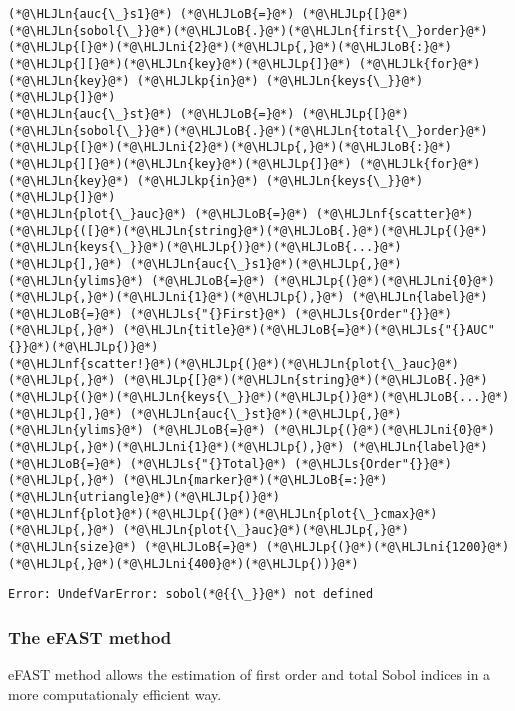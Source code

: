 \documentclass[12pt,a4paper]{article}
\newcommand{\HLJLk}[1]{\textcolor[RGB]{148,91,176}{\textbf{#1}}}
\newcommand{\HLJLkp}[1]{\textcolor[RGB]{148,91,176}{\textbf{#1}}}
\newcommand{\HLJLn}[1]{#1}
\newcommand{\HLJLnf}[1]{\textcolor[RGB]{66,102,213}{#1}}
\newcommand{\HLJLs}[1]{\textcolor[RGB]{201,61,57}{#1}}
\newcommand{\HLJLni}[1]{\textcolor[RGB]{59,151,46}{#1}}
\newcommand{\HLJLoB}[1]{\textcolor[RGB]{102,102,102}{\textbf{#1}}}
\newcommand{\HLJLp}[1]{#1}
\begin{document}
\begin{lstlisting}
(*@\HLJLn{auc{\_}s1}@*) (*@\HLJLoB{=}@*) (*@\HLJLp{[}@*)(*@\HLJLn{sobol{\_}}@*)(*@\HLJLoB{.}@*)(*@\HLJLn{first{\_}order}@*)(*@\HLJLp{[}@*)(*@\HLJLni{2}@*)(*@\HLJLp{,}@*)(*@\HLJLoB{:}@*)(*@\HLJLp{][}@*)(*@\HLJLn{key}@*)(*@\HLJLp{]}@*) (*@\HLJLk{for}@*) (*@\HLJLn{key}@*) (*@\HLJLkp{in}@*) (*@\HLJLn{keys{\_}}@*)(*@\HLJLp{]}@*)
(*@\HLJLn{auc{\_}st}@*) (*@\HLJLoB{=}@*) (*@\HLJLp{[}@*)(*@\HLJLn{sobol{\_}}@*)(*@\HLJLoB{.}@*)(*@\HLJLn{total{\_}order}@*)(*@\HLJLp{[}@*)(*@\HLJLni{2}@*)(*@\HLJLp{,}@*)(*@\HLJLoB{:}@*)(*@\HLJLp{][}@*)(*@\HLJLn{key}@*)(*@\HLJLp{]}@*) (*@\HLJLk{for}@*) (*@\HLJLn{key}@*) (*@\HLJLkp{in}@*) (*@\HLJLn{keys{\_}}@*)(*@\HLJLp{]}@*)
(*@\HLJLn{plot{\_}auc}@*) (*@\HLJLoB{=}@*) (*@\HLJLnf{scatter}@*)(*@\HLJLp{([}@*)(*@\HLJLn{string}@*)(*@\HLJLoB{.}@*)(*@\HLJLp{(}@*)(*@\HLJLn{keys{\_}}@*)(*@\HLJLp{)}@*)(*@\HLJLoB{...}@*)(*@\HLJLp{],}@*) (*@\HLJLn{auc{\_}s1}@*)(*@\HLJLp{,}@*) (*@\HLJLn{ylims}@*) (*@\HLJLoB{=}@*) (*@\HLJLp{(}@*)(*@\HLJLni{0}@*)(*@\HLJLp{,}@*)(*@\HLJLni{1}@*)(*@\HLJLp{),}@*) (*@\HLJLn{label}@*) (*@\HLJLoB{=}@*) (*@\HLJLs{"{}First}@*) (*@\HLJLs{Order"{}}@*)(*@\HLJLp{,}@*) (*@\HLJLn{title}@*)(*@\HLJLoB{=}@*)(*@\HLJLs{"{}AUC"{}}@*)(*@\HLJLp{)}@*)
(*@\HLJLnf{scatter!}@*)(*@\HLJLp{(}@*)(*@\HLJLn{plot{\_}auc}@*)(*@\HLJLp{,}@*) (*@\HLJLp{[}@*)(*@\HLJLn{string}@*)(*@\HLJLoB{.}@*)(*@\HLJLp{(}@*)(*@\HLJLn{keys{\_}}@*)(*@\HLJLp{)}@*)(*@\HLJLoB{...}@*)(*@\HLJLp{],}@*) (*@\HLJLn{auc{\_}st}@*)(*@\HLJLp{,}@*) (*@\HLJLn{ylims}@*) (*@\HLJLoB{=}@*) (*@\HLJLp{(}@*)(*@\HLJLni{0}@*)(*@\HLJLp{,}@*)(*@\HLJLni{1}@*)(*@\HLJLp{),}@*) (*@\HLJLn{label}@*) (*@\HLJLoB{=}@*) (*@\HLJLs{"{}Total}@*) (*@\HLJLs{Order"{}}@*)(*@\HLJLp{,}@*) (*@\HLJLn{marker}@*)(*@\HLJLoB{=:}@*)(*@\HLJLn{utriangle}@*)(*@\HLJLp{)}@*)
(*@\HLJLnf{plot}@*)(*@\HLJLp{(}@*)(*@\HLJLn{plot{\_}cmax}@*)(*@\HLJLp{,}@*) (*@\HLJLn{plot{\_}auc}@*)(*@\HLJLp{,}@*) (*@\HLJLn{size}@*) (*@\HLJLoB{=}@*) (*@\HLJLp{(}@*)(*@\HLJLni{1200}@*)(*@\HLJLp{,}@*)(*@\HLJLni{400}@*)(*@\HLJLp{))}@*)
\end{lstlisting}

\begin{lstlisting}
Error: UndefVarError: sobol(*@{{\_}}@*) not defined
\end{lstlisting}


\subsubsection{The eFAST method}
eFAST method allows the estimation of first order and total Sobol indices in a more computationaly efficient way.
\end{document}
